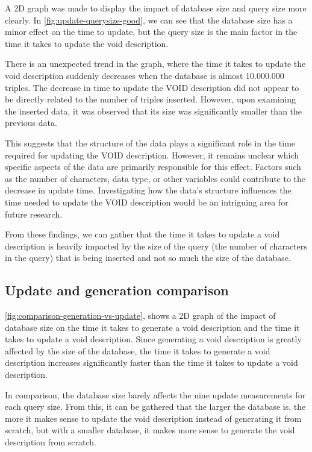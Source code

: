 A 2D graph was made to display the impact of database size and query size more clearly. In \autoref{fig:update-querysize-good}, we can see that the database size has a minor effect on the time to update, but the query size is the main factor in the time it takes to update the \gls{void} description.

There is an unexpected trend in the graph, where the time it takes to update the \gls{void} description suddenly decreases when the database is almost 10.000.000 triples. The decrease in time to update the VOID description did not appear to be directly related to the number of triples inserted. However, upon examining the inserted data, it was observed that its size was significantly smaller than the previous data.

This suggests that the structure of the data plays a significant role in the time required for updating the VOID description. However, it remains unclear which specific aspects of the data are primarily responsible for this effect. Factors such as the number of characters, data type, or other variables could contribute to the decrease in update time. Investigating how the data's structure influences the time needed to update the VOID description would be an intriguing area for future research.

From these findings, we can gather that the time it takes to update a \gls{void} description is heavily impacted by the size of the query (the number of characters in the query) that is being inserted and not so much the size of the database.


\subsection{Update and generation comparison}\label{subsec:update-generation-comparison}
\autoref{fig:comparison-generation-vs-update}, shows a 2D graph of the impact of database size on the time it takes to generate a \gls{void} description and the time it takes to update a \gls{void} description. Since generating a \gls{void} description is greatly affected by the size of the database, the time it takes to generate a \gls{void} description increases significantly faster than the time it takes to update a \gls{void} description.

In comparison, the database size barely affects the nine update measurements for each query size. From this, it can be gathered that the larger the database is, the more it makes sense to update the \gls{void} description instead of generating it from scratch, but with a smaller database, it makes more sense to generate the \gls{void} description from scratch.

